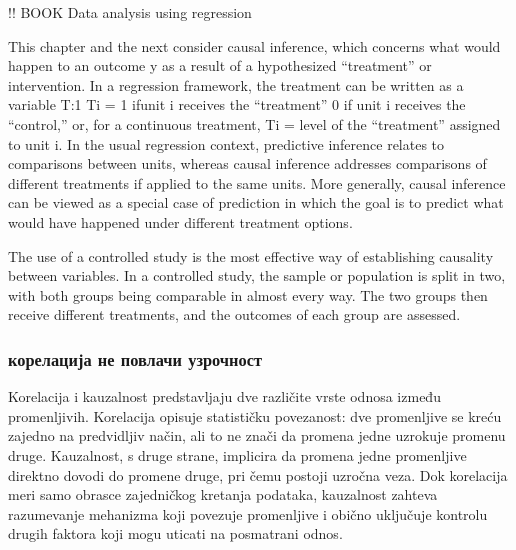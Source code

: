 \documentclass[12pt, a4paper]{article}
\begin{document}
!! BOOK Data analysis using regression

This chapter and the next consider causal inference, which concerns what would
 happen to an outcome y as a result of a hypothesized “treatment” or intervention.
 In a regression framework, the treatment can be written as a variable T:1
 Ti = 1 ifunit i receives the “treatment”
 0 if unit i receives the “control,”
 or, for a continuous treatment,
 Ti = level of the “treatment” assigned to unit i.
 In the usual regression context, predictive inference relates to comparisons between
 units, whereas causal inference addresses comparisons of different treatments if
 applied to the same units. More generally, causal inference can be viewed as a
 special case of prediction in which the goal is to predict what would have happened
 under different treatment options.


The use of a controlled study is the most effective way of establishing causality between variables. 
In a controlled study, the sample or population is split in two, with both groups being comparable in almost every way. 
The two groups then receive different treatments, and the outcomes of each group are assessed.
    \subsubsection{корелација не повлачи узрочност}
    Korelacija i kauzalnost predstavljaju dve različite vrste odnosa između promenljivih. 
    Korelacija opisuje statističku povezanost: dve promenljive se kreću zajedno na predvidljiv način, 
    ali to ne znači da promena jedne uzrokuje promenu druge. Kauzalnost, s druge strane, implicira da 
    promena jedne promenljive direktno dovodi do promene druge, pri čemu postoji uzročna veza. 
    Dok korelacija meri samo obrasce zajedničkog kretanja podataka, kauzalnost zahteva razumevanje 
    mehanizma koji povezuje promenljive i obično uključuje kontrolu drugih faktora koji mogu uticati na posmatrani odnos.
\end{document}
